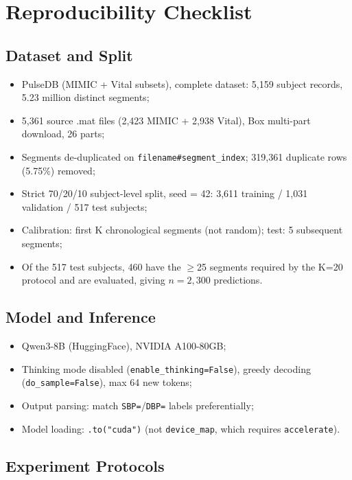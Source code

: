 \chapter{Reproducibility Checklist}
\label{app:reproducibility}

\section{Dataset and Split}

\begin{itemize}
  \item PulseDB (MIMIC + Vital subsets), complete dataset: 5,159 subject records, 5.23 million distinct segments;
  \item 5,361 source .mat files (2,423 MIMIC + 2,938 Vital), Box multi-part download, 26 parts;
  \item Segments de-duplicated on \texttt{filename\#segment\_index}; 319,361 duplicate rows (5.75\%) removed;
  \item Strict 70/20/10 subject-level split, seed = 42: 3,611 training / 1,031 validation / 517 test subjects;
  \item Calibration: first K chronological segments (not random); test: 5 subsequent segments;
  \item Of the 517 test subjects, 460 have the $\geq$25 segments required by the K=20 protocol and are evaluated, giving $n = 2{,}300$ predictions.
\end{itemize}

\section{Model and Inference}

\begin{itemize}
  \item Qwen3-8B (HuggingFace), NVIDIA A100-80GB;
  \item Thinking mode disabled (\texttt{enable\_thinking=False}), greedy decoding (\texttt{do\_sample=False}), max 64 new tokens;
  \item Output parsing: match \texttt{SBP=}/\texttt{DBP=} labels preferentially;
  \item Model loading: \texttt{.to("cuda")} (not \texttt{device\_map}, which requires \texttt{accelerate}).
\end{itemize}

\section{Experiment Protocols}

